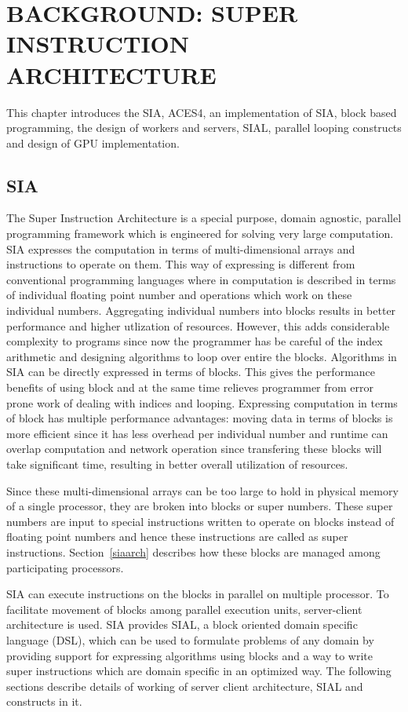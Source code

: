 \chapter{BACKGROUND: SUPER INSTRUCTION ARCHITECTURE} \label{background}

This chapter introduces the SIA, ACES4, an implementation of SIA, block based
programming, the design of workers and servers, SIAL, parallel looping constructs
and design of GPU implementation.

\section{SIA}
The Super Instruction Architecture is a special purpose, domain agnostic,
parallel programming framework which is engineered for solving very large
computation. SIA expresses the computation in terms of multi-dimensional arrays and
instructions to operate on them. This way of expressing is different from conventional programming
languages where in computation is described in terms of individual floating point
number and operations which work on these individual numbers. Aggregating
individual numbers into blocks results in better performance and higher utlization
of resources. However, this adds considerable complexity to programs since now
the programmer has be careful of the index arithmetic and designing algorithms to loop
over entire the blocks. Algorithms in SIA can be directly expressed in terms of
blocks. This gives the performance benefits of using block and at the same time relieves
programmer from error prone work of dealing with indices and looping. Expressing
computation in terms of block has multiple performance advantages: moving data in terms
of blocks is more efficient since it has less overhead per individual number
and runtime can overlap computation and network operation since transfering these
blocks will take significant time, resulting in better overall utilization of resources.

Since these multi-dimensional arrays can be too
large to hold in physical memory of a single processor, they are broken into
blocks or super numbers. These super numbers are input to special instructions
written to operate on blocks instead of floating point numbers and hence these
instructions are called as super instructions. Section~\ref{siaarch} describes how
these blocks are managed among participating processors.

SIA can execute instructions on the blocks in parallel on multiple processor. To
facilitate movement of blocks among parallel execution units, server-client
architecture is used. SIA provides SIAL, a block oriented domain specific
language (DSL), which can be used to formulate problems of any domain by providing
support for expressing algorithms using blocks and a way
to write super instructions which are domain specific in an optimized way. The
following sections describe details of working of server client architecture,
SIAL and constructs in it.


